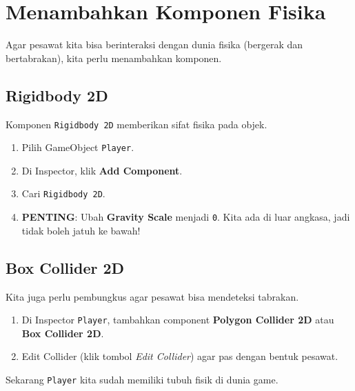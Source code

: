 
\section{Menambahkan Komponen Fisika}

Agar pesawat kita bisa berinteraksi dengan dunia fisika (bergerak dan bertabrakan), kita perlu menambahkan komponen.

\subsection{Rigidbody 2D}

Komponen \texttt{Rigidbody 2D} memberikan sifat fisika pada objek.

\begin{enumerate}
    \item Pilih GameObject \texttt{Player}.
    \item Di Inspector, klik \textbf{Add Component}.
    \item Cari \texttt{Rigidbody 2D}.
    \item \textbf{PENTING}: Ubah \textbf{Gravity Scale} menjadi \texttt{0}. Kita ada di luar angkasa, jadi tidak boleh jatuh ke bawah!
\end{enumerate}

\subsection{Box Collider 2D}

Kita juga perlu pembungkus agar pesawat bisa mendeteksi tabrakan.

\begin{enumerate}
    \item Di Inspector \texttt{Player}, tambahkan component \textbf{Polygon Collider 2D} atau \textbf{Box Collider 2D}.
    \item Edit Collider (klik tombol \textit{Edit Collider}) agar pas dengan bentuk pesawat.
\end{enumerate}

Sekarang \texttt{Player} kita sudah memiliki tubuh fisik di dunia game.

